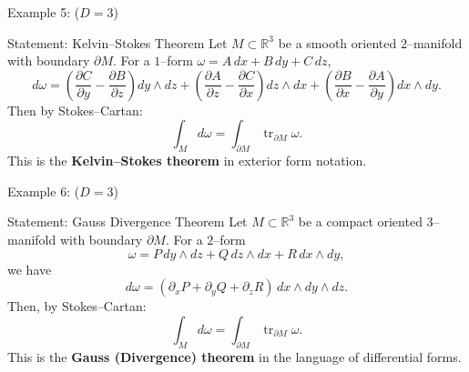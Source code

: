 \begin{frame}{Example 5: (\(D=3\))}
\vspace{-0.3cm}
\begin{block}{Statement: Kelvin–Stokes Theorem }
Let \(M\subset\mathbb{R}^3\) be a smooth oriented $2$–manifold with boundary $\partial M$.
For a $1$–form \(\omega = A\,dx + B\,dy + C\,dz\),
\vspace{-0.2cm}
\[
d\omega
=\left(\frac{\partial C}{\partial y}-\frac{\partial B}{\partial z}\right)dy\wedge dz
+\left(\frac{\partial A}{\partial z}-\frac{\partial C}{\partial x}\right)dz\wedge dx
+\left(\frac{\partial B}{\partial x}-\frac{\partial A}{\partial y}\right)dx\wedge dy.
\]
Then by Stokes–Cartan:
\vspace{-0.2cm}
\[
\int_M d\omega
=\int_{\partial M}\operatorname{tr}_{\partial M}\omega.
\]
This is the \textbf{Kelvin–Stokes theorem} in exterior form notation.
\end{block}

\begin{center}
\vspace{-0.2cm}
\end{center}
\end{frame}


\begin{frame}{Example 6: (\(D=3\))}
\begin{block}{Statement: Gauss Divergence Theorem }
Let \(M\subset\mathbb{R}^3\) be a compact oriented $3$–manifold with boundary \(\partial M\).
For a $2$–form
\[
\omega = P\,dy\wedge dz + Q\,dz\wedge dx + R\,dx\wedge dy,
\]
we have
\[
d\omega
=(\partial_x P + \partial_y Q + \partial_z R)\,dx\wedge dy\wedge dz.
\]
Then, by Stokes–Cartan:
\[
\int_M d\omega
=\int_{\partial M}\operatorname{tr}_{\partial M}\omega.
\]
This is the \textbf{Gauss (Divergence) theorem} in the language of differential forms.
\end{block}
\end{frame}

